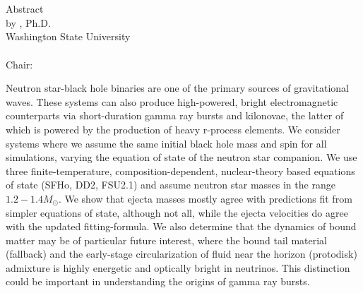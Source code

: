 \label{chap:chapter-1}

\begin{center}
	\begin{singlespace}
		\label{ssec:abstract}

		\MakeUppercase{\mytitleA}\\
    	\bigskip
    	\MakeUppercase{\mytitleB}\\
		\bigskip
		Abstract\\
		\bigskip \bigskip \bigskip
		by \myname, Ph.D.\\
		Washington State University\\
		\, \currentyear \\
		\bigskip \bigskip \bigskip
		Chair: \mychair	
	\end{singlespace}
\end{center}
  

Neutron star-black hole binaries are one of the primary sources of 
gravitational waves.  
These systems can also produce high-powered,
bright electromagnetic counterparts via short-duration gamma
ray bursts and kilonovae, the latter of which is powered by the production
of heavy r-process elements.
We consider systems where we assume the same initial black hole mass
and spin for all simulations, varying the equation of state of the neutron
star companion.
We use three finite-temperature, composition-dependent, nuclear-theory based
equations of state (SFHo, DD2, FSU2.1) and assume neutron star masses
in the range $1.2 - 1.4 M_\odot$.
We show that ejecta masses mostly agree with predictions fit from simpler 
equations of state, although not all, while the ejecta velocities do agree with the 
updated fitting-formula.
We also determine that the dynamics of bound matter may be of particular future interest,
where the bound tail material (fallback) and the early-stage circularization 
of fluid near the horizon (protodisk) admixture is highly energetic and 
optically bright in neutrinos.
This distinction could be important in understanding the origins of 
gamma ray bursts.


\newpage